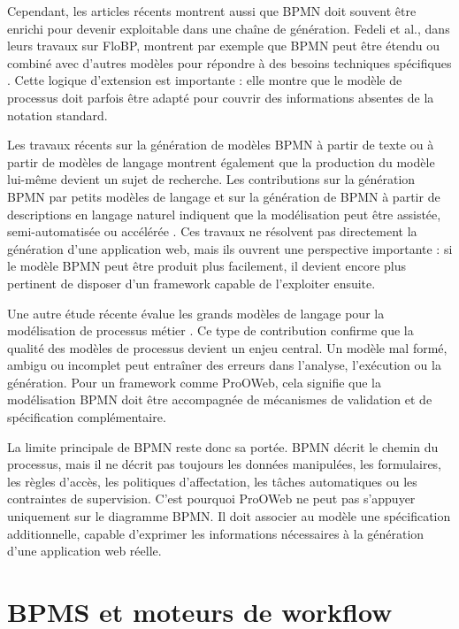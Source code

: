 \documentclass[12pt,a4paper]{article}
\begin{document}
Cependant, les articles récents montrent aussi que BPMN doit souvent être enrichi pour devenir exploitable dans une chaîne de génération. Fedeli et al., dans leurs travaux sur FloBP, montrent par exemple que BPMN peut être étendu ou combiné avec d'autres modèles pour répondre à des besoins techniques spécifiques \cite{fedeli2024}. Cette logique d'extension est importante : elle montre que le modèle de processus doit parfois être adapté pour couvrir des informations absentes de la notation standard.

Les travaux récents sur la génération de modèles BPMN à partir de texte ou à partir de modèles de langage montrent également que la production du modèle lui-même devient un sujet de recherche. Les contributions sur la génération BPMN par petits modèles de langage et sur la génération de BPMN à partir de descriptions en langage naturel indiquent que la modélisation peut être assistée, semi-automatisée ou accélérée \cite{smallllm2025,nltobpmn2026}. Ces travaux ne résolvent pas directement la génération d'une application web, mais ils ouvrent une perspective importante : si le modèle BPMN peut être produit plus facilement, il devient encore plus pertinent de disposer d'un framework capable de l'exploiter ensuite.

Une autre étude récente évalue les grands modèles de langage pour la modélisation de processus métier \cite{llmbpm2025}. Ce type de contribution confirme que la qualité des modèles de processus devient un enjeu central. Un modèle mal formé, ambigu ou incomplet peut entraîner des erreurs dans l'analyse, l'exécution ou la génération. Pour un framework comme ProOWeb, cela signifie que la modélisation BPMN doit être accompagnée de mécanismes de validation et de spécification complémentaire.

La limite principale de BPMN reste donc sa portée. BPMN décrit le chemin du processus, mais il ne décrit pas toujours les données manipulées, les formulaires, les règles d'accès, les politiques d'affectation, les tâches automatiques ou les contraintes de supervision. C'est pourquoi ProOWeb ne peut pas s'appuyer uniquement sur le diagramme BPMN. Il doit associer au modèle une spécification additionnelle, capable d'exprimer les informations nécessaires à la génération d'une application web réelle.

\section{BPMS et moteurs de workflow}
\end{document}
